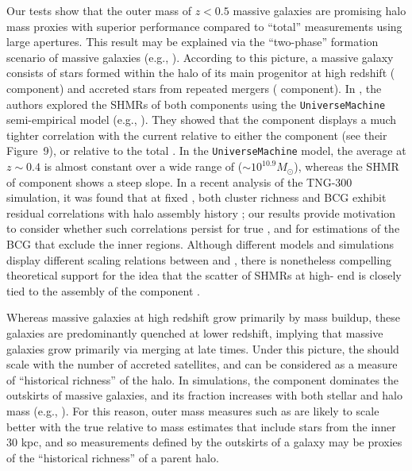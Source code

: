 \documentclass[fleqn,usenatbib,useAMS]{mnras}
\begin{document}
\begin{CJK*}{UTF8}{gbsn}
    Our \topn{} tests show that the outer mass of $z < 0.5$ massive galaxies are promising halo mass
    proxies with superior performance compared to ``total'' \mstar{} measurements using large 
    apertures.
    This result may be explained via the ``two-phase'' formation scenario of massive galaxies (e.g.,
    \citealt{Oser2010, vanDokkum2010, Moster2020}). 
    According to this picture, a massive galaxy consists of stars formed within the halo of its main
    progenitor at high redshift (\insitu{} component) and accreted stars from repeated mergers 
    (\exsitu{} component).
    In \citet{Bradshaw2020}, the authors explored the SHMRs of both components using the
    \texttt{UniverseMachine} semi-empirical model (e.g., \citealt{Behroozi2018}). 
    They showed that the \exsitu{} component displays a much tighter correlation with the current
    \mvir{} relative to either the \insitu{} component (see their Figure~9), or relative to the
    total \mstar{}.
    In the \texttt{UniverseMachine} model, the average \insitu{} \mstar{} at $z \sim 0.4$ is almost
    constant over a wide range of \mvir{} ($\sim 10^{10.9} M_{\odot}$), whereas the SHMR of
    \exsitu{} component shows a steep slope.
    In a recent analysis of the TNG-300 simulation, it was found that at fixed \mvir{}, both cluster
    richness and BCG \mstar{} exhibit residual correlations with halo assembly history
    \citep{Anbajagane2020}; our results provide motivation to consider whether such correlations
    persist for true \exsitu{} \mstar{}, and for \mstar{} estimations of the BCG that exclude the
    inner regions.
    Although different models and simulations display different scaling relations between \mvir{}
    and \exsitu{} \mstar{}, there is nonetheless compelling theoretical support for the idea that
    the scatter of SHMRs at high-\mvir{} end is closely tied to the assembly of the \exsitu{}
    component \citep[see, e.g.,][]{Gu2016}.

    Whereas massive galaxies at high redshift grow primarily by \insitu{} mass buildup, these
    galaxies are predominantly quenched at lower redshift, implying that massive galaxies grow
    primarily via merging at late times.  
    Under this picture, the \exsitu{} \mstar{} should scale with the number of accreted satellites,
    and can be considered as a measure of ``historical richness'' of the halo. 
    In simulations, the \exsitu{} component dominates the outskirts of massive galaxies, and its
    fraction increases with both stellar and halo mass (e.g., \citealt{Lackner2012,
    RodriguezGomez2016, Pulsoni2021, Pillepich2017b}). 
    For this reason, outer mass measures such as  are likely to scale better with the
    true \exsitu{} \mstar{} relative to mass estimates that include stars from the inner 30 kpc, and
    so \mstar{} measurements defined by the outskirts of a galaxy may be proxies of the ``historical
    richness'' of a parent halo.


\end{CJK*}
\end{document}
